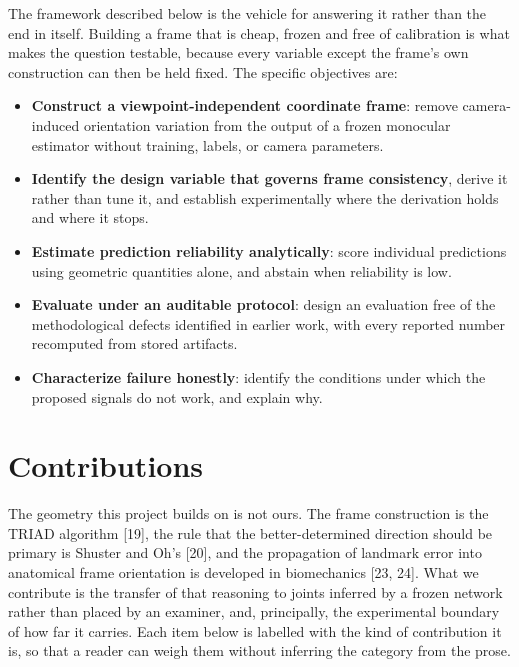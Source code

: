 \documentclass[12pt,a4paper]{report}
\begin{document}
The framework described below is the vehicle for answering it rather than the end in itself. Building a frame that is cheap, frozen and free of calibration is what makes the question testable, because every variable except the frame's own construction can then be held fixed. The specific objectives are:

\begin{itemize}
\item \textbf{Construct a viewpoint-independent coordinate frame}: remove camera-induced orientation variation from the output of a frozen monocular estimator without training, labels, or camera parameters.

\item \textbf{Identify the design variable that governs frame consistency}, derive it rather than tune it, and establish experimentally where the derivation holds and where it stops.

\item \textbf{Estimate prediction reliability analytically}: score individual predictions using geometric quantities alone, and abstain when reliability is low.

\item \textbf{Evaluate under an auditable protocol}: design an evaluation free of the methodological defects identified in earlier work, with every reported number recomputed from stored artifacts.

\item \textbf{Characterize failure honestly}: identify the conditions under which the proposed signals do not work, and explain why.
\end{itemize}

\section{Contributions}

The geometry this project builds on is not ours. The frame construction is the TRIAD algorithm [19], the rule that the better-determined direction should be primary is Shuster and Oh's [20], and the propagation of landmark error into anatomical frame orientation is developed in biomechanics [23, 24]. What we contribute is the transfer of that reasoning to joints inferred by a frozen network rather than placed by an examiner, and, principally, the experimental boundary of how far it carries. Each item below is labelled with the kind of contribution it is, so that a reader can weigh them without inferring the category from the prose.
\end{document}
